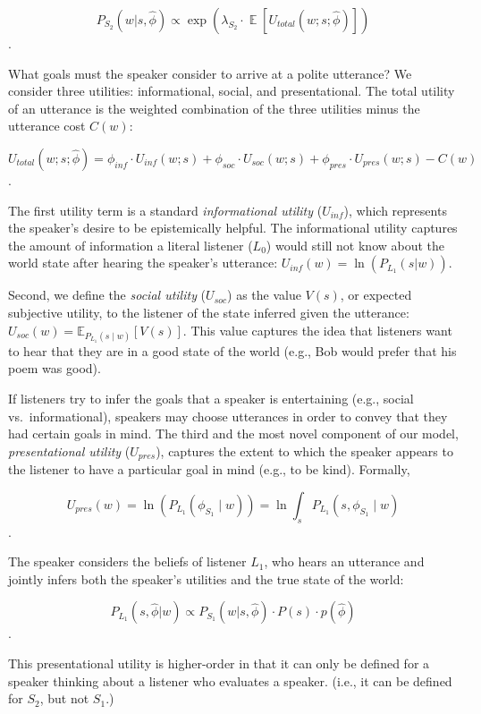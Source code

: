 \documentclass[12pt]{article}
\begin{document}
\[P_{S_2}(w | s, \hat{\phi}) \propto \exp(\lambda_{S_2} \cdot \mathop{\mathbb{E}}[U_{total}(w; s; \hat{\phi})])\].

What goals must the speaker consider to arrive at a polite utterance? We
consider three utilities: informational, social, and presentational. The
total utility of an utterance is the weighted combination of the three
utilities minus the utterance cost \(C(w)\):

\[U_{total}(w; s; \hat{\phi}) = \phi_{inf} \cdot U_{inf}(w; s) + \phi_{soc} \cdot U_{soc}(w; s) + \phi_{pres} \cdot U_{pres}(w; s) - C(w)\].

The first utility term is a standard \emph{informational utility}
(\(U_{inf}\)), which represents the speaker's desire to be epistemically
helpful. The informational utility captures the amount of information a
literal listener (\(L_0\)) would still not know about the world state
after hearing the speaker's utterance:
\(U_{inf}(w) = \ln(P_{L_1}(s | w))\).

Second, we define the \emph{social utility} (\(U_{soc}\)) as the value
\(V(s)\), or expected subjective utility, to the listener of the state
inferred given the utterance:
\(U_{soc}(w) = \mathbb{E}_{P_{L_1}(s \mid w)}[V(s)]\). This value
captures the idea that listeners want to hear that they are in a good
state of the world (e.g., Bob would prefer that his poem was good).

If listeners try to infer the goals that a speaker is entertaining
(e.g., social vs.~informational), speakers may choose utterances in
order to convey that they had certain goals in mind. The third and the
most novel component of our model, \emph{presentational utility}
(\(U_{pres}\)), captures the extent to which the speaker appears to the
listener to have a particular goal in mind (e.g., to be kind). Formally,

\[U_{pres}(w) = \ln(P_{L_1}(\phi_{S_1} \mid w)) = \ln \int_s P_{L_1}(s, \phi_{S_1} \mid w)\].

The speaker considers the beliefs of listener \(L_1\), who hears an
utterance and jointly infers both the speaker's utilities and the true
state of the world:

\[P_{L_1}(s, \hat{\phi} | w) \propto P_{S_1}(w | s, \hat{\phi}) \cdot P(s) \cdot p(\hat{\phi})\].

This presentational utility is higher-order in that it can only be
defined for a speaker thinking about a listener who evaluates a speaker.
(i.e., it can be defined for \(S_2\), but not \(S_1\).)
\end{document}
